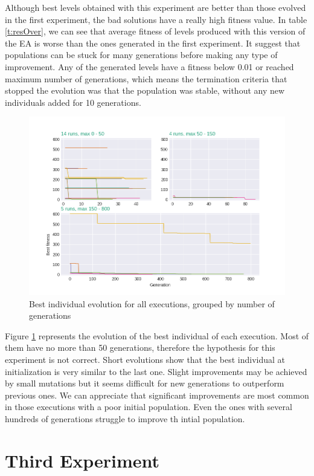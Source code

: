 Although best levels obtained with this experiment are better than those evolved in the first experiment, the bad solutions have a really high fitness value. In table \ref{t:resOver}, we can see that average fitness of levels produced with this version of the \acs{EA} is worse than the ones generated in the first experiment. It suggest that populations can be stuck for many generations before making any type of improvement. Any of the generated levels have a fitness below 0.01 or reached maximum number of generations, which means the termination criteria  that stopped the evolution was that the population was stable, without any new individuals added for 10 generations. 
\begin{figure}[H]
	\centering
	\includegraphics[scale=0.5]{gfx/exp2_explication.png}
	\caption{Best individual evolution for all executions, grouped by number of generations}\label{f:grahp2}
\end{figure}
Figure \ref{f:grahp2} represents the evolution of the best individual of each execution. Most of them have no more than 50 generations, therefore the hypothesis for this experiment is not correct. Short evolutions show that the best individual at initialization is very similar to the last one. Slight improvements may be achieved by small mutations but it seems difficult for new generations to outperform previous ones. We can appreciate that significant improvements are most common in those executions with a poor initial population. Even the ones with several hundreds of generations struggle to improve th intial population.

\section{Third Experiment}
